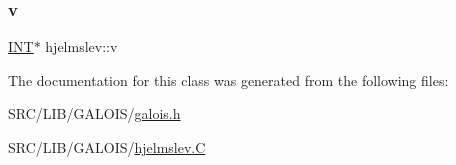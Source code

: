 \mbox{\label{classhjelmslev_aaca784320c476c0704c9ea375b02699e}} 
\subsubsection{\texorpdfstring{v}{v}}
{\footnotesize\ttfamily \mbox{\hyperlink{galois_8h_a09fddde158a3a20bd2dcadb609de11dc}{I\+NT}}$\ast$ hjelmslev\+::v}



The documentation for this class was generated from the following files\+:\begin{DoxyCompactItemize}
\item 
S\+R\+C/\+L\+I\+B/\+G\+A\+L\+O\+I\+S/\mbox{\hyperlink{galois_8h}{galois.\+h}}\item 
S\+R\+C/\+L\+I\+B/\+G\+A\+L\+O\+I\+S/\mbox{\hyperlink{hjelmslev_8_c}{hjelmslev.\+C}}\end{DoxyCompactItemize}
